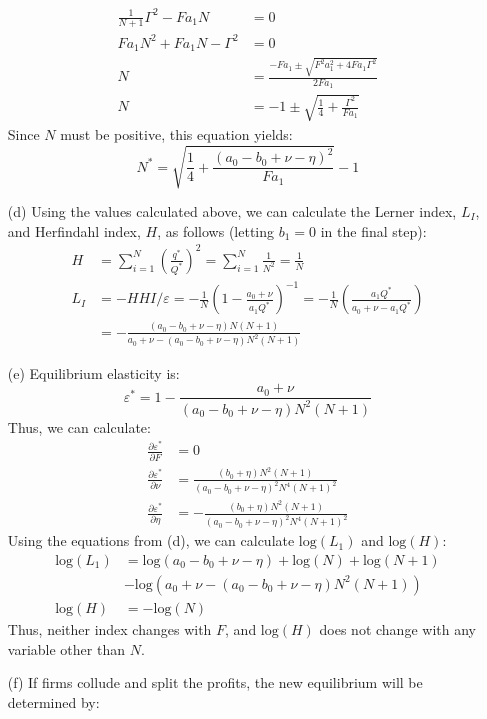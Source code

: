 \documentclass{article}
\newcommand{\loge}[1]{\text{log}\left(#1\right)}
\newcommand{\pl}{\partial}
\begin{document}
\begin{itemize}
\begin{align*}
      \frac{1}{N+1}\Gamma^2 - Fa_1N &= 0  \\
      Fa_1N^2 + Fa_1N - \Gamma^2 &= 0     \\
      N &= \frac{-Fa_1 \pm \sqrt{F^2a_1^2 + 4Fa_1\Gamma^2}}{2Fa_1}  \\
      N &= -1 \pm \sqrt{\frac{1}{4} + \frac{\Gamma^2}{Fa_1}}
    \end{align*}
    Since $N$ must be positive, this equation yields:\[
      N^* = \sqrt{\frac{1}{4} + \frac{(a_0 - b_0 + \nu - \eta)^2}{Fa_1}}-1
    \]
    \item[(d)] Using the values calculated above, we can calculate the Lerner index, $L_I$, and Herfindahl index, $H$, as follows (letting ${b_1=0}$ in the final step): \begin{align*} 
      H &= \sum_{i=1}^N\left(\frac{q^*}{Q^*}\right)^2 = \sum_{i=1}^N\frac{1}{N^2} = \frac{1}{N} \\
      L_I &=  -HHI/\varepsilon = -\frac{1}{N}\left(1 - \frac{a_0 + \nu}{a_1Q^*}\right)^{-1} =  -\frac{1}{N}\left(\frac{a_1Q^*}{a_0 + \nu - a_1Q^*}\right) \\ &= -\frac{\left(a_0-b_0+\nu-\eta\right)N(N+1)}{a_0 + \nu - \left(a_0-b_0+\nu-\eta\right)N^2(N+1)}
    \end{align*} 
    \item[(e)] Equilibrium elasticity is: \[
      \varepsilon^* = 1- \frac{a_0 + \nu}{(a_0-b_0+\nu-\eta)N^2(N+1)}
    \]
    Thus, we can calculate:\begin{align*}
      \frac{\pl\varepsilon^*}{\pl F}    &= 0                                        \\
      \frac{\pl\varepsilon^*}{\pl \nu}  &= \frac{(b_0 + \eta)N^2(N+1)}{(a_0-b_0+\nu-\eta)^2N^4(N+1)^2} \\
      \frac{\pl\varepsilon^*}{\pl \eta} &= -\frac{(b_0 + \eta)N^2(N+1)}{(a_0-b_0+\nu-\eta)^2N^4(N+1)^2}
    \end{align*}
    Using the equations from (d), we can calculate $\loge{L_1}$ and $\loge{H}$:\begin{align*}
      \loge{L_1}  &= \loge{a_0-b_0 + \nu - \eta} + \loge{N} + \loge{N+1} \\
                  &- \loge{a_0 + \nu - \left(a_0-b_0+\nu-\eta\right)N^2(N+1)} \\
      \loge{H}    &= -\loge{N}
    \end{align*}
    Thus, neither index changes with $F$, and $\loge{H}$ does not change with any variable other than $N$.
    \item[(f)] If firms collude and split the profits, the new equilibrium will be determined by: \[
\]
\end{itemize}
\end{document}
